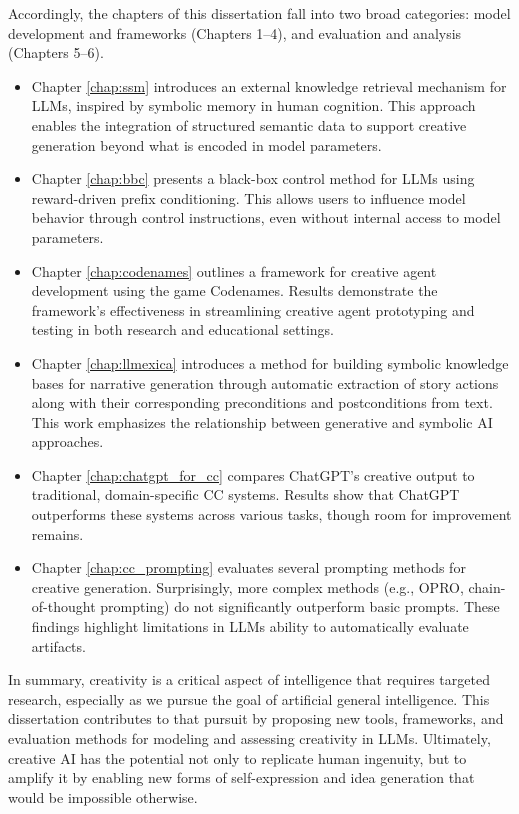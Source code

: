 \documentclass[phd,electronic,oneside,twosidetoc,letterpaper,chaptercenter,parttop,lof]{byumsphd}
\begin{document}
Accordingly, the chapters of this dissertation fall into two broad categories: model development and frameworks (Chapters 1–4), and evaluation and analysis (Chapters 5–6).
\begin{itemize}
    \item Chapter \ref{chap:ssm} introduces an external knowledge retrieval mechanism for LLMs, inspired by symbolic memory in human cognition. This approach enables the integration of structured semantic data to support creative generation beyond what is encoded in model parameters.
    \item Chapter \ref{chap:bbc} presents a black-box control method for LLMs using reward-driven prefix conditioning. This allows users to influence model behavior through control instructions, even without internal access to model parameters.
    \item Chapter \ref{chap:codenames} outlines a framework for creative agent development using the game Codenames. Results demonstrate the framework’s effectiveness in streamlining creative agent prototyping and testing in both research and educational settings. 
    \item Chapter \ref{chap:llmexica} introduces a method for building symbolic knowledge bases for narrative generation through automatic extraction of story actions along with their corresponding preconditions and postconditions from text. This work emphasizes the relationship between generative and symbolic AI approaches.
    \item Chapter \ref{chap:chatgpt_for_cc} compares ChatGPT’s creative output to traditional, domain-specific CC systems. Results show that ChatGPT outperforms these systems across various tasks, though room for improvement remains.
    \item Chapter \ref{chap:cc_prompting} evaluates several prompting methods for creative generation. Surprisingly, more complex methods (e.g., OPRO, chain-of-thought prompting) do not significantly outperform basic prompts. These findings highlight limitations in LLMs ability to automatically evaluate artifacts.
\end{itemize}

In summary, creativity is a critical aspect of intelligence that requires targeted research, especially as we pursue the goal of artificial general intelligence. 
This dissertation contributes to that pursuit by proposing new tools, frameworks, and evaluation methods for modeling and assessing creativity in LLMs. 
Ultimately, creative AI has the potential not only to replicate human ingenuity, but to amplify it by enabling new forms of self-expression and idea generation that would be impossible otherwise.
\end{document}
